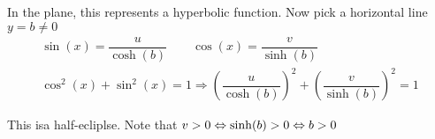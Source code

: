 \begin{prf}[]{}
  \noindent In the plane, this represents a hyperbolic function. Now pick a horizontal line $y = b\neq0$
  \begin{equation*}
    \begin{gathered}
      \sin(x) = \dfrac{u}{\cosh(b)}\qquad\cos(x) = \dfrac{v}{\sinh(b)}\\
      \cos^2(x)+\sin^2(x) =1\Rightarrow \left(\dfrac{u}{\cosh(b)}\right)^2+\left(\dfrac{v}{\sinh(b)}\right)^2=1
    \end{gathered}
  \end{equation*}
  \par\bigskip
  \noindent This isa  half-ecliplse. Note that $v>0\Leftrightarrow \sinh(b)>0\Leftrightarrow b>0$
  \par\bigskip
\end{prf}
\par\bigskip
